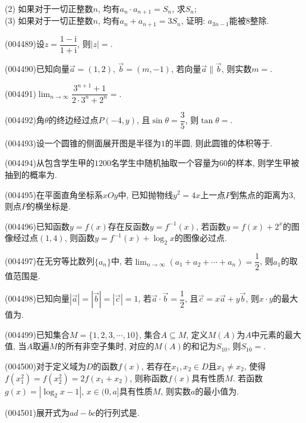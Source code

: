 (2) 如果对于一切正整数$n$, 均有$a_n\cdot a_{n+1}=S_n$, 求$S_n$;\\
(3) 如果对于一切正整数$n$, 均有$a_n+a_{n+1}=3S_n$, 证明: $a_{3n-1}$能被$8$整除.
\item (004489)设$z=\dfrac{1-\mathrm{i}}{1+\mathrm{i}}$, 则$|z|=$.
\item (004490)已知向量$\overrightarrow a=(1,2)$, $\overrightarrow b=(m,-1)$, 若向量$\overrightarrow a\parallel \overrightarrow b$, 则实数$m=$.
\item (004491)$\displaystyle\lim_{n\to \infty}\dfrac{3^{n+1}+1}{2\cdot 3^n+2^n}=$.
\item (004492)角$\theta$的终边经过点$P(-4,y)$, 且$\sin\theta =\dfrac 35$, 则$\tan\theta=$.
\item (004493)设一个圆锥的侧面展开图是半径为$1$的半圆, 则此圆锥的体积等于.
\item (004494)从包含学生甲的$1200$名学生中随机抽取一个容量为$60$的样本, 则学生甲被抽到的概率为.
\item (004495)在平面直角坐标系$xOy$中, 已知抛物线$y^2=4x$上一点$P$到焦点的距离为$3$, 则点$P$的横坐标是.
\item (004496)已知函数$y=f(x)$存在反函数$y=f^{-1}(x)$, 若函数$y=f(x)+2^x$的图像经过点$(1,4)$, 则函数$y=f^{-1}(x)+\log_2x$的图像必过点.
\item (004497)在无穷等比数列$\{a_n\}$中, 若$\displaystyle\lim_{n\to \infty}(a_1+a_2+\cdots +a_n)=\dfrac 12$, 则$a_1$的取值范围是.
\item (004498)已知向量$|\overrightarrow a|=|\overrightarrow b|=|\overrightarrow c|=1$, 若$\overrightarrow a\cdot \overrightarrow b=\dfrac 12$, 且$\overrightarrow c=x\overrightarrow a+y\overrightarrow b$, 则$x\cdot y$的最大值为.
\item (004499)已知集合$M=\{1,2,3,\cdots,10\}$, 集合$A\subseteq M$, 定义$M(A)$为$A$中元素的最大值, 当$A$取遍$M$的所有非空子集时, 对应的$M(A)$的和记为$S_{10}$, 则$S_{10}=$.
\item (004500)对于定义域为$D$的函数$f(x)$, 若存在$x_1,x_2\in D$且$x_1\ne x_2$, 使得$f(x_1^2)=f(x_2^2)=2f(x_1+x_2)$, 则称函数$f(x)$具有性质$M$. 若函数$g(x)=|\log_2x-1|$, $x\in (0,a]$具有性质$M$, 则实数$a$的最小值为.
\item (004501)展开式为$ad-bc$的行列式是.
